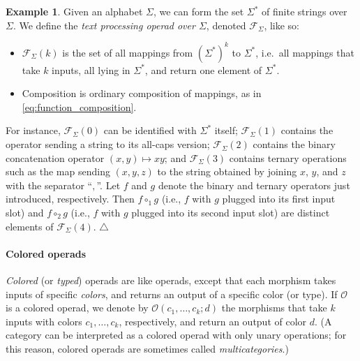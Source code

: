\documentclass{article}
\theoremstyle{plain}
\theoremstyle{definition}
\theoremstyle{remark}
\theoremstyle{definition}
\newtheorem{example}[theorem]{Example}
\newcommand\cF{\mathcal{F}}
\newcommand\cO{\mathcal{O}}
\begin{document}
\begin{example}
Given an alphabet $\Sigma$, we can form the set $\Sigma^*$ of finite strings over $\Sigma$.
We define the \emph{text processing operad over $\Sigma$}, denoted $\cF_\Sigma$, like so:
\begin{itemize}
\item $\cF_\Sigma(k)$ is the set of all mappings from $(\Sigma^*)^k$ to $\Sigma^*$, i.e.\ all mappings that take $k$ inputs, all lying in $\Sigma^*$, and return one element of $\Sigma^*$.

\item Composition is ordinary composition of mappings, as in \eqref{eq:function_composition}.
\end{itemize}
\noindent
For instance, $\cF_\Sigma(0)$ can be identified with $\Sigma^*$ itself; $\cF_\Sigma(1)$ contains the operator sending a string to its all-caps version; $\cF_\Sigma(2)$ contains the binary concatenation operator $(x,y)\mapsto xy$; and $\cF_\Sigma(3)$ contains ternary operations such as the map sending $(x,y,z)$ to the string obtained by joining $x$, $y$, and $z$ with the separator ``$\mathtt{,}$''.
Let $f$ and $g$ denote the binary and ternary operators just introduced, respectively.
Then $f \circ_1 g$ (i.e., $f$ with $g$ plugged into its first input slot) and $f \circ_2 g$ (i.e., $f$ with $g$ plugged into its second input slot) are distinct elements of $\cF_\Sigma(4)$.
\null\hfill$\triangle$
\label{ex:text_processing}
\end{example}

\paragraph{Colored operads}
\emph{Colored} (or \emph{typed}) operads are like operads, except that each morphism takes inputs of specific \emph{colors}, and returns an output of a specific color (or type).
If $\cO$ is a colored operad, we denote by $\cO(c_1,\ldots,c_k;d)$ the morphisms that take $k$ inputs with colors $c_1, \ldots, c_k$, respectively, and return an output of color $d$.
(A category can be interpreted as a colored operad with only unary operations; for this reason, colored operads are sometimes called \emph{multicategories}.)
\end{document}
